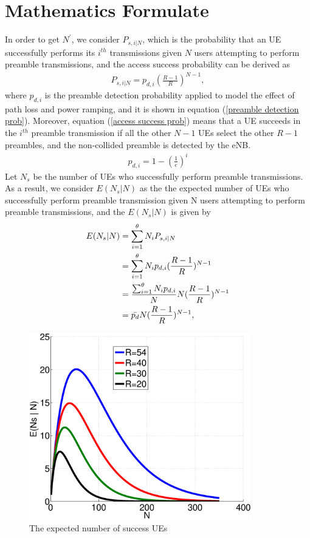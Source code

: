  \section{Mathematics Formulate}
 \label{Mathmatics}
    In order to get $N^{\prime}$, we consider $P_{s,i|N}$, which is the probability that an UE successfully performs its $i^{th}$ transmissions given $N$ users attempting to perform preamble transmissions, and the access success probability can be derived as
     \begin{eqnarray}
     \label{access success prob}
         P_{s,i|N}=p_{d,i}(\frac{R-1}{R})^{N-1},
     \end{eqnarray}
     where $p_{d,i}$ is the preamble detection probability applied to model the effect of path loss and power ramping, and it is shown in equation (\ref{preamble detection prob}). Moreover, equation (\ref{access success prob}) means that a UE succeeds in the $i^{th}$ preamble transmission if all the other $N - 1$ UEs select the other $R - 1$ preambles, and the non-collided preamble is detected by the eNB.
     \begin{eqnarray}
     \label{preamble detection prob}
         p_{d,i} = 1 - (\frac{1}{e})^i
     \end{eqnarray}
     Let $N_s$ be the number of UEs who successfully perform preamble transmissions. As a result, we consider $E(N_s|N)$ as the the expected number of UEs who successfully perform preamble transmission given N users attempting to perform preamble transmissions, and the $E(N_s|N)$ is given by
     \begin{align}
     \label{exp devices}
         E{(N_s|N)}&=\sum_{i=1}^{\theta}N_i P_{s,i|N} \notag \\
         &=\sum_{i=1}^{\theta}N_i p_{d,i} (\frac{R-1}{R})^{N-1} \notag \\
         &=\frac{\sum_{i=1}^{\theta}  N_i p_{d,i}}{N} N (\frac{R-1}{R})^{N-1} \notag \\
         &=\bar{p_d} N (\frac{R-1}{R})^{N-1},
     \end{align}
    \begin{figure}[t]
    \centering
    \includegraphics[width=3.8in]{fig_exp_suc_UE.eps}
    \caption{The expected number of success UEs}
    \label{fig_exp_suc_UE}
    \end{figure}
